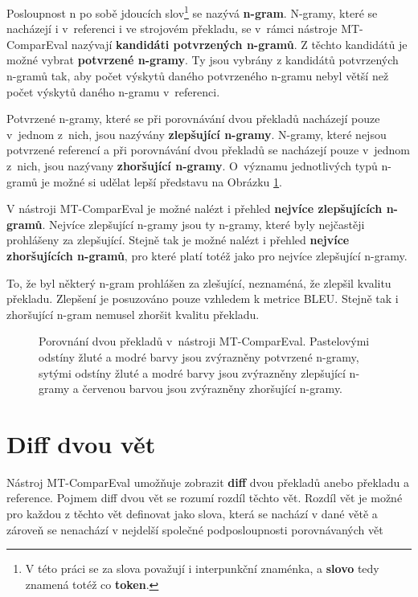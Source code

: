 Posloupnost n po sobě jdoucích slov\footnote{
  V této práci se za slova považují i interpunkční znaménka, a \textbf{slovo} tedy znamená totéž co \textbf{token}.}
  se nazývá \textbf{\mbox{n-gram}}.
N-gramy,
  které se nacházejí i v~referenci i ve strojovém překladu,
  se v~rámci nástroje \mbox{MT-ComparEval} nazývají \textbf{kandidáti potvrzených \mbox{n-gramů}}.
Z těchto kandidátů je možné vybrat \textbf{potvrzené \mbox{n-gramy}}.
Ty jsou vybrány z kandidátů potvrzených \mbox{n-gramů} tak,
  aby počet výskytů daného potvrzeného \mbox{n-gramu} nebyl větší než počet výskytů daného \mbox{n-gramu} v~referenci.

Potvrzené \mbox{n-gramy},
  které se při porovnávání dvou překladů nacházejí pouze v~jednom z~nich,
  jsou nazývány \textbf{zlepšující \mbox{n-gramy}}.
N-gramy,
  které nejsou potvrzené referencí
  a při porovnávání dvou překladů se nacházejí pouze v~jednom z~nich,
  jsou nazývany \textbf{zhoršující \mbox{n-gramy}}.
O~významu jednotlivých typů \mbox{n-gramů} je možné si udělat lepší představu na Obrázku \ref{img:n-grams}.

V nástroji \mbox{MT-ComparEval} je možné nalézt i přehled \textbf{nejvíce zlepšujících \mbox{n-gramů}}.
Nejvíce zlepšující \mbox{n-gramy} jsou ty n-gramy,
  které byly nejčastěji prohlášeny za zlepšující.
Stejně tak je možné nalézt i přehled \textbf{nejvíce zhoršujících \mbox{n-gramů}},
  pro které platí totéž jako pro nejvíce zlepšující n-gramy.

To,
  že byl některý \mbox{n-gram} prohlášen za zlešující,
  neznaméná, že zlepšil kvalitu překladu.
Zlepšení je posuzováno pouze vzhledem k metrice BLEU.
Stejně tak i zhoršující n-gram nemusel zhoršit kvalitu překladu.

\begin{figure}
	\caption{
		Porovnání dvou překladů v~nástroji \mbox{MT-ComparEval}.
		Pastelovými odstíny žluté a modré barvy jsou zvýrazněny potvrzené \mbox{n-gramy},
		sytými odstíny žluté a modré barvy jsou zvýrazněny zlepšující \mbox{n-gramy}
		a červenou barvou jsou zvýrazněny zhoršující \mbox{n-gramy}.
	}
	\label{img:n-grams}
\end{figure}

\section{Diff dvou vět}
Nástroj \mbox{MT-ComparEval} umožňuje zobrazit \textbf{diff} dvou překladů anebo překladu a reference.
Pojmem diff dvou vět se rozumí rozdíl těchto vět.
Rozdíl vět je možné pro každou z těchto vět definovat jako slova,
  která se nachází v dané větě
  a zároveň se nenachází v nejdelší společné podposloupnosti porovnávaných vět

